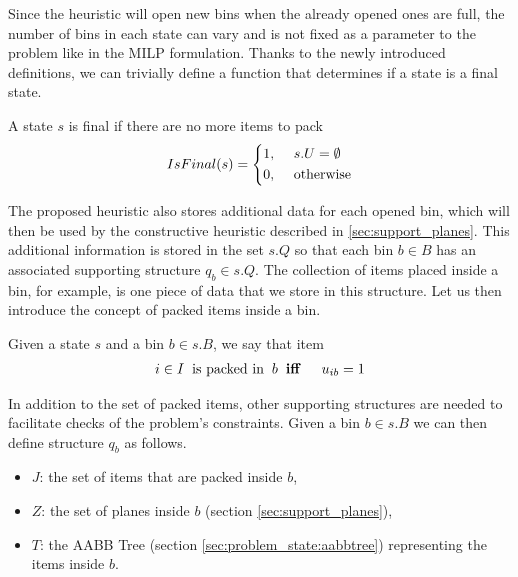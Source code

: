Since the heuristic will open new bins when the already opened ones are full, the number of bins in each state can vary and is not fixed as a parameter to the problem like in the MILP formulation.
Thanks to the newly introduced definitions, we can trivially define a function that determines if a state is a final state.
\begin{definition}
    \label{def:state_final}
    A state $s$ is final if there are no more items to pack
    \begin{equation}
        \label{algo:state_final}%
        IsFinal(s) = \left\{\begin{aligned}
            1,\hspace{0.5cm}& s.U = \emptyset \\
            0,\hspace{0.5cm}& \text{otherwise}
        \end{aligned}
        \right.
    \end{equation}
\end{definition}

The proposed heuristic also stores additional data for each opened bin, which will then be used by the constructive heuristic described in \cref{sec:support_planes}.
This additional information is stored in the set $s.Q$ so that each bin $b \in B$ has an associated supporting structure $q_b \in s.Q$.
The collection of items placed inside a bin, for example, is one piece of data that we store in this structure.
Let us then introduce the concept of packed items inside a bin.
\begin{definition}
    Given a state $s$ and a bin $b \in s.B$, we say that item
    \begin{equation*}
        \begin{aligned}
            i \in I \hspace{.2cm}\text{is packed in} \hspace{.2cm}b \hspace{.2cm}& \textbf{iff} \hspace{.2cm}& u_{ib} = 1
        \end{aligned}
    \end{equation*}
\end{definition}

In addition to the set of packed items, other supporting structures are needed to facilitate checks of the problem's constraints.
Given a bin $b \in s.B$ we can then define structure $q_b$ as follows.
\begin{itemize}
    \item $J$: the set of items that are packed inside $b$,
    \item $Z$: the set of planes inside $b$ (section \ref{sec:support_planes}),
    \item $T$: the AABB Tree (section \ref{sec:problem_state:aabbtree}) representing the items inside $b$.
\end{itemize}

